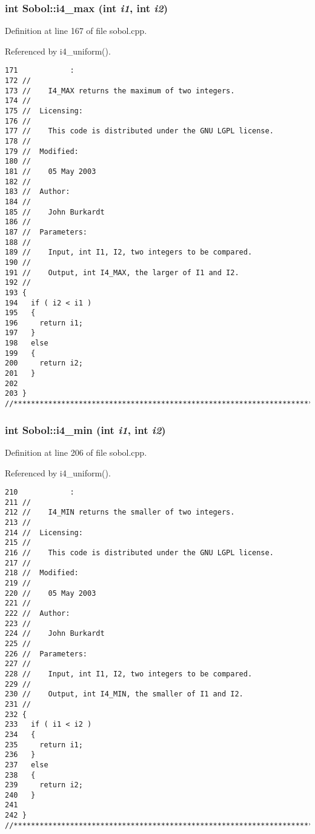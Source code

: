 \subsubsection{\setlength{\rightskip}{0pt plus 5cm}int Sobol::i4\_\-max (int {\em i1}, int {\em i2})}\label{namespaceSobol_0080494dcd3b0b5cc2d9716ccf7011ca}




Definition at line 167 of file sobol.cpp.

Referenced by i4\_\-uniform().

\begin{Code}\begin{verbatim}171            :
172 //
173 //    I4_MAX returns the maximum of two integers.
174 //
175 //  Licensing:
176 //
177 //    This code is distributed under the GNU LGPL license. 
178 //
179 //  Modified:
180 //
181 //    05 May 2003
182 //
183 //  Author:
184 //
185 //    John Burkardt
186 //
187 //  Parameters:
188 //
189 //    Input, int I1, I2, two integers to be compared.
190 //
191 //    Output, int I4_MAX, the larger of I1 and I2.
192 //
193 {
194   if ( i2 < i1 ) 
195   {
196     return i1;
197   }
198   else 
199   {
200     return i2;
201   }
202 
203 }
//****************************************************************************80
\end{verbatim}
\end{Code}


\subsubsection{\setlength{\rightskip}{0pt plus 5cm}int Sobol::i4\_\-min (int {\em i1}, int {\em i2})}\label{namespaceSobol_1b11f98f3d3a04e144df5f1a78f8085d}




Definition at line 206 of file sobol.cpp.

Referenced by i4\_\-uniform().

\begin{Code}\begin{verbatim}210            :
211 //
212 //    I4_MIN returns the smaller of two integers.
213 //
214 //  Licensing:
215 //
216 //    This code is distributed under the GNU LGPL license. 
217 //
218 //  Modified:
219 //
220 //    05 May 2003
221 //
222 //  Author:
223 //
224 //    John Burkardt
225 //
226 //  Parameters:
227 //
228 //    Input, int I1, I2, two integers to be compared.
229 //
230 //    Output, int I4_MIN, the smaller of I1 and I2.
231 //
232 {
233   if ( i1 < i2 ) 
234   {
235     return i1;
236   }
237   else 
238   {
239     return i2;
240   }
241 
242 }
//****************************************************************************80
\end{verbatim}
\end{Code}


